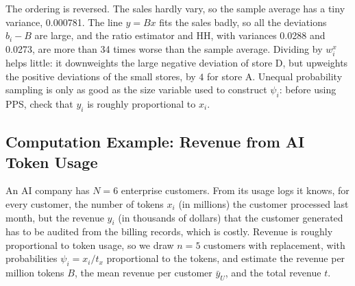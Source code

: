 \documentclass[
  letterpaper,
  DIV=11,
  numbers=noendperiod]{scrreprt}
\renewcommand{\[}{\begin{equation}}
\renewcommand{\]}{\end{equation}}
\begin{document}
The ordering is reversed. The sales hardly vary, so the sample average
has a tiny variance, 0.000781. The line \(y=Bx\) fits the sales badly,
so all the deviations \(b_i-B\) are large, and the ratio estimator and
HH, with variances 0.0288 and 0.0273, are more than 34 times worse than
the sample average. Dividing by \(w^x_i\) helps little: it downweights
the large negative deviation of store D, but upweights the positive
deviations of the small stores, by \(4\) for store A. Unequal
probability sampling is only as good as the size variable used to
construct \(\psi_i\): before using PPS, check that \(y_i\) is roughly
proportional to \(x_i\).

\subsection{Computation Example: Revenue from AI Token
Usage}\label{sec-ups-toy-sample}

An AI company has \(N=6\) enterprise customers. From its usage logs it
knows, for every customer, the number of tokens \(x_i\) (in millions)
the customer processed last month, but the revenue \(y_i\) (in thousands
of dollars) that the customer generated has to be audited from the
billing records, which is costly. Revenue is roughly proportional to
token usage, so we draw \(n=5\) customers with replacement, with
probabilities \(\psi_i=x_i/t_x\) proportional to the tokens, and
estimate the revenue per million tokens \(B\), the mean revenue per
customer \(\bar{y}_U\), and the total revenue \(t\).
\end{document}
